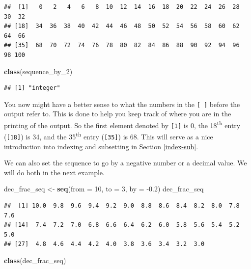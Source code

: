 \documentclass[]{tufte-book}
\newenvironment{Shaded}{\begin{snugshade}}{\end{snugshade}}
\newcommand{\KeywordTok}[1]{\textcolor[rgb]{0.13,0.29,0.53}{\textbf{{#1}}}}
\newcommand{\DataTypeTok}[1]{\textcolor[rgb]{0.13,0.29,0.53}{{#1}}}
\newcommand{\DecValTok}[1]{\textcolor[rgb]{0.00,0.00,0.81}{{#1}}}
\newcommand{\FloatTok}[1]{\textcolor[rgb]{0.00,0.00,0.81}{{#1}}}
\newcommand{\StringTok}[1]{\textcolor[rgb]{0.31,0.60,0.02}{{#1}}}
\newcommand{\NormalTok}[1]{{#1}}
\theoremstyle{definition}
\theoremstyle{definition}
\theoremstyle{remark}
\begin{document}
\begin{verbatim}
##  [1]   0   2   4   6   8  10  12  14  16  18  20  22  24  26  28  30  32
## [18]  34  36  38  40  42  44  46  48  50  52  54  56  58  60  62  64  66
## [35]  68  70  72  74  76  78  80  82  84  86  88  90  92  94  96  98 100
\end{verbatim}

\begin{Shaded}
\begin{Highlighting}[]
\KeywordTok{class}\NormalTok{(sequence_by_2)}
\end{Highlighting}
\end{Shaded}

\begin{verbatim}
## [1] "integer"
\end{verbatim}

You now might have a better sense to what the numbers in the
\texttt{{[}\ {]}} before the output refer to. This is done to help you
keep track of where you are in the printing of the output. So the first
element denoted by \texttt{{[}1{]}} is 0, the 18\textsuperscript{th}
entry (\texttt{{[}18{]}}) is 34, and the 35\textsuperscript{th} entry
(\texttt{{[}35{]}}) is 68. This will serve as a nice introduction into
indexing and subsetting in Section \ref{index-sub}.

We can also set the sequence to go by a negative number or a decimal
value. We will do both in the next example.

\begin{Shaded}
\begin{Highlighting}[]
\NormalTok{dec_frac_seq <-}\StringTok{ }\KeywordTok{seq}\NormalTok{(}\DataTypeTok{from =} \DecValTok{10}\NormalTok{, }\DataTypeTok{to =} \DecValTok{3}\NormalTok{, }\DataTypeTok{by =} \NormalTok{-}\FloatTok{0.2}\NormalTok{)}
\NormalTok{dec_frac_seq}
\end{Highlighting}
\end{Shaded}

\begin{verbatim}
##  [1] 10.0  9.8  9.6  9.4  9.2  9.0  8.8  8.6  8.4  8.2  8.0  7.8  7.6
## [14]  7.4  7.2  7.0  6.8  6.6  6.4  6.2  6.0  5.8  5.6  5.4  5.2  5.0
## [27]  4.8  4.6  4.4  4.2  4.0  3.8  3.6  3.4  3.2  3.0
\end{verbatim}

\begin{Shaded}
\begin{Highlighting}[]
\KeywordTok{class}\NormalTok{(dec_frac_seq)}
\end{Highlighting}
\end{Shaded}
\end{document}
